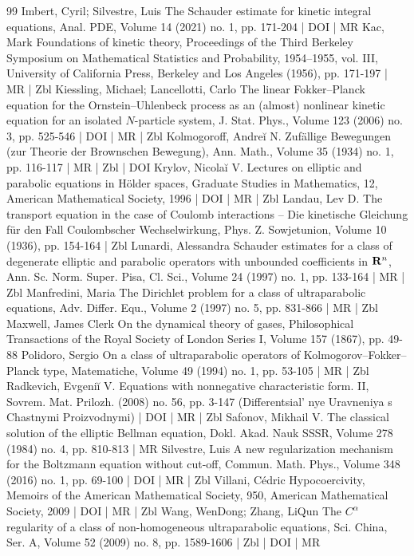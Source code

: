 \begin{thebibliography}{99}
Imbert, Cyril; Silvestre, Luis The Schauder estimate for kinetic integral equations, Anal. PDE, Volume 14 (2021) no. 1, pp. 171-204 | DOI | MR
Kac, Mark Foundations of kinetic theory, Proceedings of the Third Berkeley Symposium on Mathematical Statistics and Probability, 1954–1955, vol. III, University of California Press, Berkeley and Los Angeles (1956), pp. 171-197 | MR | Zbl
Kiessling, Michael; Lancellotti, Carlo The linear Fokker–Planck equation for the Ornstein–Uhlenbeck process as an (almost) nonlinear kinetic equation for an isolated ${N}$-particle system, J. Stat. Phys., Volume 123 (2006) no. 3, pp. 525-546 | DOI | MR | Zbl
Kolmogoroff, Andreĭ N. Zufällige Bewegungen (zur Theorie der Brownschen Bewegung), Ann. Math., Volume 35 (1934) no. 1, pp. 116-117 | MR | Zbl | DOI
Krylov, Nicolaĭ V. Lectures on elliptic and parabolic equations in Hölder spaces, Graduate Studies in Mathematics, 12, American Mathematical Society, 1996 | DOI | MR | Zbl
Landau, Lev D. The transport equation in the case of Coulomb interactions – Die kinetische Gleichung für den Fall Coulombscher Wechselwirkung, Phys. Z. Sowjetunion, Volume 10 (1936), pp. 154-164 | Zbl
Lunardi, Alessandra Schauder estimates for a class of degenerate elliptic and parabolic operators with unbounded coefficients in ${\bf {R}}^n$, Ann. Sc. Norm. Super. Pisa, Cl. Sci., Volume 24 (1997) no. 1, pp. 133-164 | MR | Zbl
Manfredini, Maria The Dirichlet problem for a class of ultraparabolic equations, Adv. Differ. Equ., Volume 2 (1997) no. 5, pp. 831-866 | MR | Zbl
Maxwell, James Clerk On the dynamical theory of gases, Philosophical Transactions of the Royal Society of London Series I, Volume 157 (1867), pp. 49-88
Polidoro, Sergio On a class of ultraparabolic operators of Kolmogorov–Fokker–Planck type, Matematiche, Volume 49 (1994) no. 1, pp. 53-105 | MR | Zbl
Radkevich, Evgeniĭ V. Equations with nonnegative characteristic form. II, Sovrem. Mat. Prilozh. (2008) no. 56, pp. 3-147 (Differentsial' nye Uravneniya s Chastnymi Proizvodnymi) | DOI | MR | Zbl
Safonov, Mikhail V. The classical solution of the elliptic Bellman equation, Dokl. Akad. Nauk SSSR, Volume 278 (1984) no. 4, pp. 810-813 | MR
Silvestre, Luis A new regularization mechanism for the Boltzmann equation without cut-off, Commun. Math. Phys., Volume 348 (2016) no. 1, pp. 69-100 | DOI | MR | Zbl
Villani, Cédric Hypocoercivity, Memoirs of the American Mathematical Society, 950, American Mathematical Society, 2009 | DOI | MR | Zbl
Wang, WenDong; Zhang, LiQun The ${C}^\alpha $ regularity of a class of non-homogeneous ultraparabolic equations, Sci. China, Ser. A, Volume 52 (2009) no. 8, pp. 1589-1606 | Zbl | DOI | MR
\end{thebibliography}
